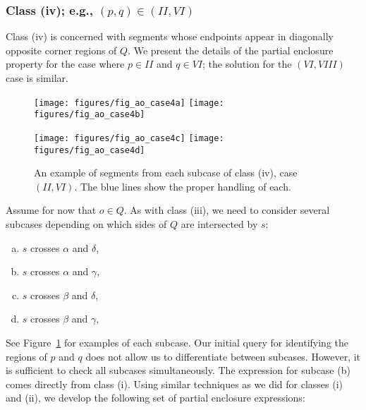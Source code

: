 \subsubsection{Class (iv); e.g., $(p, q) \in (II, VI)$}
\label{:rectanges:ao:class4}

Class (iv) is concerned with segments whose endpoints appear in diagonally opposite corner regions of $Q$. 
We present the details of the partial enclosure property for the case where $p \in II$ and $q \in VI$; the solution for the $(VI, VIII)$ case is similar.

\begin{figure}[t]
\begin{center}
  \texttt{[image: figures/fig\_ao\_case4a]}
  \hspace{1.0em}
  \texttt{[image: figures/fig\_ao\_case4b]}

  \vspace{2.0em}
  
  \texttt{[image: figures/fig\_ao\_case4c]}
  \hspace{1.0em}
  \texttt{[image: figures/fig\_ao\_case4d]}

  \caption[An example of a segment in class (iv), case $(II, VI)$.]{An example of segments from each subcase of class (iv), case $(II, VI)$. The blue lines show the proper handling of each.}
  \label{fig:rectangles:ao:case4}
\end{center}
\end{figure}

Assume for now that $o \in Q$. As with class (iii), we need to consider several subcases depending on which sides of $Q$ are intersected by $s$:

\begin{enumerate}[(a)]
\item $s$ crosses $\alpha$ and $\delta$,
\item $s$ crosses $\alpha$ and $\gamma$,
\item $s$ crosses $\beta$ and $\delta$,
\item $s$ crosses $\beta$ and $\gamma$,
\end{enumerate}

See Figure~\ref{fig:rectangles:ao:case4} for examples of each subcase. 
Our initial query for identifying the regions of $p$ and $q$ does not allow us to differentiate between subcases. 
However, it is sufficient to check all subcases simultaneously. The expression for subcase (b) comes directly from class (i).
Using similar techniques as we did for classes (i) and (ii), we develop the following set of partial enclosure expressions:

